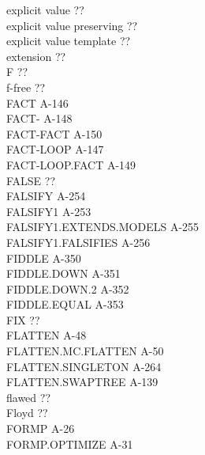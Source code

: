 \documentclass[10pt]{book}
\newenvironment{pubasis}{\begin{flushleft}}{\end{flushleft}}
\begin{document}
\begin{pubasis}
explicit value                               ??\\
explicit value preserving                    ??\\
explicit value template                      ??\\
extension                                    ??\\
F                                            ??\\
f-free                                       ??\\
FACT                                         A-146\\
FACT-                                        A-148\\
FACT-FACT                                    A-150\\
FACT-LOOP                                    A-147\\
FACT-LOOP.FACT                               A-149\\
FALSE                                        ??\\
FALSIFY                                      A-254\\
FALSIFY1                                     A-253\\
FALSIFY1.EXTENDS.MODELS                      A-255\\
FALSIFY1.FALSIFIES                           A-256\\
FIDDLE                                       A-350\\
FIDDLE.DOWN                                  A-351\\
FIDDLE.DOWN.2                                A-352\\
FIDDLE.EQUAL                                 A-353\\
FIX                                          ??\\
FLATTEN                                      A-48\\
FLATTEN.MC.FLATTEN                           A-50\\
FLATTEN.SINGLETON                            A-264\\
FLATTEN.SWAPTREE                             A-139\\
flawed                                       ??\\
Floyd                                        ??\\
FORMP                                        A-26\\
FORMP.OPTIMIZE                               A-31\\

\end{pubasis}
\end{document}
